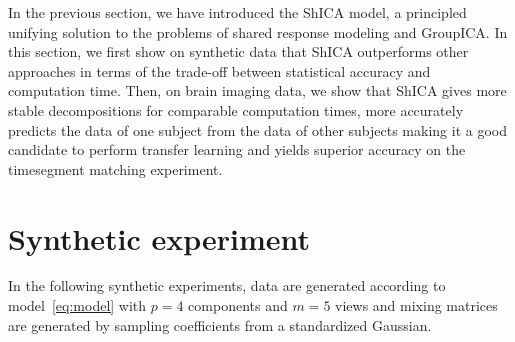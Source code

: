 In the previous section, we have introduced the ShICA model, a principled
unifying solution to the problems of shared response
modeling and GroupICA. In this section, we first show on synthetic data that ShICA
outperforms other approaches in terms of the trade-off between statistical
accuracy and computation time. Then, on brain imaging data, we show that ShICA
gives more stable decompositions for comparable computation times, more
accurately predicts the data of one subject from the data of other subjects
making it a good candidate to perform transfer learning and yields superior
accuracy on the timesegment matching experiment.

\section{Synthetic experiment}
In the following synthetic experiments, data are generated according to model~\eqref{eq:model} with $p=4$ components and $m=5$ views and mixing matrices are generated by sampling coefficients from a standardized Gaussian.
